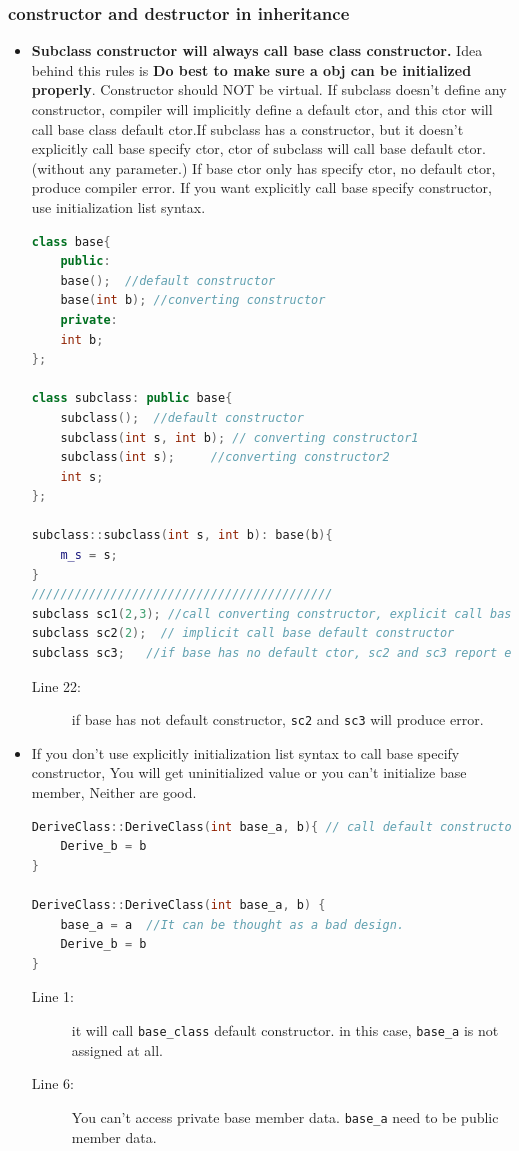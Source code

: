 \documentclass[a4paper,11pt,twoside]{book}
\begin{document}
\subsubsection{constructor and destructor in inheritance}
\begin{itemize}
	\item  \textbf{Subclass constructor will always call base class constructor.} Idea behind this rules is \textbf{Do best to make sure a obj can be initialized properly}. Constructor should NOT be virtual. If subclass doesn't define any constructor, compiler will implicitly define a default ctor, and this ctor will call base class default ctor.If subclass has a constructor, but it doesn't explicitly call base specify ctor, ctor of subclass will call base default ctor.(without any parameter.) If base ctor only has specify ctor, no default ctor, produce compiler error. If you want explicitly call base specify constructor, use initialization list syntax.	
\begin{lstlisting}[frame=single, language=c++]
class base{
	public:
	base();  //default constructor
	base(int b); //converting constructor
	private:
	int b;
};
	
class subclass: public base{
	subclass();  //default constructor
	subclass(int s, int b); // converting constructor1
	subclass(int s);     //converting constructor2
	int s;
};
	
subclass::subclass(int s, int b): base(b){
	m_s = s;
}
//////////////////////////////////////////
subclass sc1(2,3); //call converting constructor, explicit call base constructor constructor.
subclass sc2(2);  // implicit call base default constructor
subclass sc3;   //if base has no default ctor, sc2 and sc3 report error
\end{lstlisting}
\begin{description}
	\item[Line 22:] if base has not default constructor, \texttt{sc2} and \texttt{sc3} will produce error.
\end{description}

	\item If you don't use  explicitly initialization list syntax to call base specify constructor, You will get uninitialized value or you can't initialize base member, Neither are good.
\begin{lstlisting}[frame=single, language=c++]
DeriveClass::DeriveClass(int base_a, b){ // call default constructor,  
	Derive_b = b
}	

DeriveClass::DeriveClass(int base_a, b) {
	base_a = a  //It can be thought as a bad design.
	Derive_b = b
}
\end{lstlisting}
\begin{description}
	\item[Line 1:] it will call \texttt{base\_class} default constructor. in this case, \texttt{base\_a} is not assigned at all.
	\item[Line 6:] You can't  access private base member data. \texttt{base\_a} need to be public member data.
\end{description}


\end{itemize}
\end{document}
